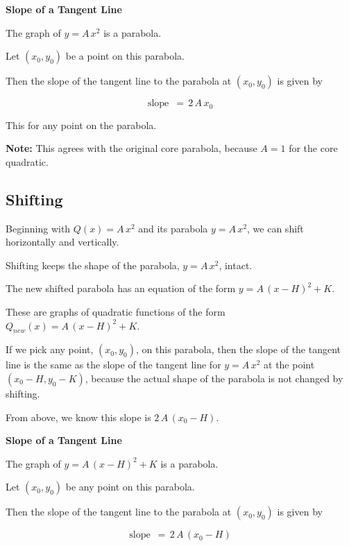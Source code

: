 \documentclass{ximera}
\begin{document}
\begin{conclusion} \textbf{\textcolor{green!25!black}{Slope of a Tangent Line}} 


The graph of $y = A \, x^2$ is a parabola.

Let $(x_0, y_0)$ be a point on this parabola.

Then the slope of the tangent line to the parabola at $(x_0, y_0)$ is given by 



\[ \text{slope } \, = \, 2 \, A \, x_0  \]


\end{conclusion}
This for any point on the parabola.

\textbf{Note:} This agrees with the original core parabola, because $A = 1$ for the core quadratic.


















\subsection*{Shifting}




Beginning with $Q(x) = A \, x^2$ and its parabola $y = A \, x^2$, we can shift horizontally and vertically. 





Shifting keeps the shape of the parabola, $y = A \, x^2$, intact. 


The new shifted parabola has an equation of the form $y = A \, (x - H)^2 + K$.

These are graphs of quadratic functions of the form $Q_{new}(x) = A \, (x - H)^2 + K$. 


If we pick any point, $(x_0, y_0)$, on this parabola, then the slope of the tangent line is the same as the slope of the tangent line for $y = A \, x^2$ at the point $(x_0 - H, y_0 - K)$, because the actual shape of the parabola is not changed by shifting.  

From above, we know this slope is \textbf{$2 \, A \, (x_0 - H)$}.






\begin{conclusion} \textbf{\textcolor{green!25!black}{Slope of a Tangent Line}} 


The graph of $y = A \, (x - H)^2 + K$ is a parabola.

Let $(x_0, y_0)$ be any point on this parabola.

Then the slope of the tangent line to the parabola at $(x_0, y_0)$ is given by 



\[ \text{slope } \, = \, 2 \, A \, (x_0 - H)  \]


\end{conclusion}
\end{document}
